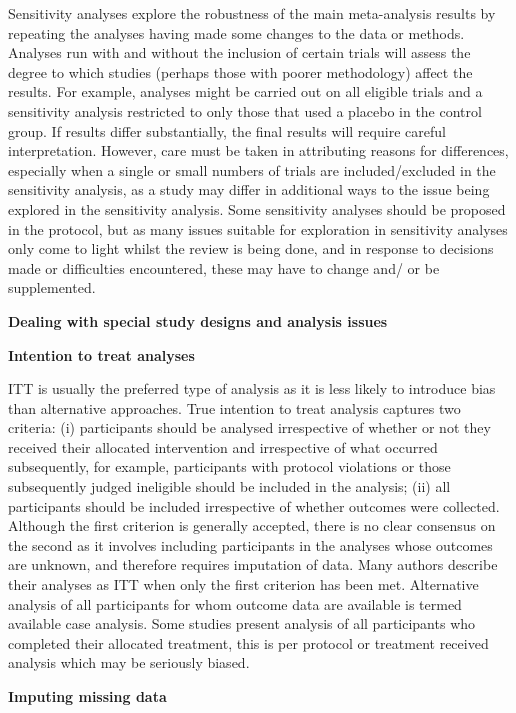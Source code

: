 \documentclass[
  10pt,
  a4paper,
  DIV=11,
  numbers=noendperiod]{scrreprt}
\begin{document}
Sensitivity analyses explore the robustness of the main meta-analysis
results by repeating the analyses having made some changes to the data
or methods. Analyses run with and without the inclusion of certain
trials will assess the degree to which studies (perhaps those with
poorer methodology) affect the results. For example, analyses might be
carried out on all eligible trials and a sensitivity analysis restricted
to only those that used a placebo in the control group. If results
differ substantially, the final results will require careful
interpretation. However, care must be taken in attributing reasons for
differences, especially when a single or small numbers of trials are
included/excluded in the sensitivity analysis, as a study may differ in
additional ways to the issue being explored in the sensitivity analysis.
Some sensitivity analyses should be proposed in the protocol, but as
many issues suitable for exploration in sensitivity analyses only come
to light whilst the review is being done, and in response to decisions
made or difficulties encountered, these may have to change and/ or be
supplemented.

\textbf{Dealing with special study designs and analysis issues}

\textbf{Intention to treat analyses}

ITT is usually the preferred type of analysis as it is less likely to
introduce bias than alternative approaches. True intention to treat
analysis captures two criteria: (i) participants should be analysed
irrespective of whether or not they received their allocated
intervention and irrespective of what occurred subsequently, for
example, participants with protocol violations or those subsequently
judged ineligible should be included in the analysis; (ii) all
participants should be included irrespective of whether outcomes were
collected. Although the first criterion is generally accepted, there is
no clear consensus on the second as it involves including participants
in the analyses whose outcomes are unknown, and therefore requires
imputation of data. Many authors describe their analyses as ITT when
only the first criterion has been met. Alternative analysis of all
participants for whom outcome data are available is termed available
case analysis. Some studies present analysis of all participants who
completed their allocated treatment, this is per protocol or treatment
received analysis which may be seriously biased.

\textbf{Imputing missing data}
\end{document}
